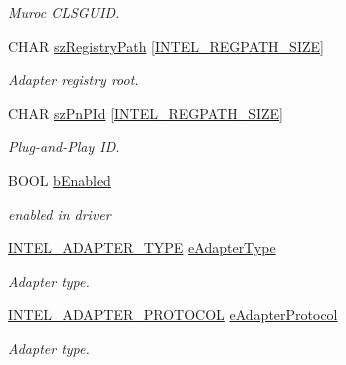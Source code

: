 \begin{DoxyCompactItemize}
\begin{DoxyCompactList}\small\item\em Muroc C\+L\+S\+G\+U\+ID. \end{DoxyCompactList}\item 
C\+H\+AR \hyperlink{struct_i_n_t_e_l___a_d_a_p_t_e_r___l_i_s_t___e_n_t_r_y_ad178b9652af00eb62eb340935223402c}{sz\+Registry\+Path} \mbox{[}\hyperlink{intel__wireless_8hpp_a72b0ab4e2fb5f31d00948cfe36b8440e}{I\+N\+T\+E\+L\+\_\+\+R\+E\+G\+P\+A\+T\+H\+\_\+\+S\+I\+ZE}\mbox{]}
\begin{DoxyCompactList}\small\item\em Adapter registry root. \end{DoxyCompactList}\item 
C\+H\+AR \hyperlink{struct_i_n_t_e_l___a_d_a_p_t_e_r___l_i_s_t___e_n_t_r_y_a135fb44299c2c5a066e24535839ce70c}{sz\+Pn\+P\+Id} \mbox{[}\hyperlink{intel__wireless_8hpp_a72b0ab4e2fb5f31d00948cfe36b8440e}{I\+N\+T\+E\+L\+\_\+\+R\+E\+G\+P\+A\+T\+H\+\_\+\+S\+I\+ZE}\mbox{]}
\begin{DoxyCompactList}\small\item\em Plug-\/and-\/\+Play ID. \end{DoxyCompactList}\item 
B\+O\+OL \hyperlink{struct_i_n_t_e_l___a_d_a_p_t_e_r___l_i_s_t___e_n_t_r_y_a5c36e949e9ef3119ff45bb3f6a981f0c}{b\+Enabled}
\begin{DoxyCompactList}\small\item\em enabled in driver \end{DoxyCompactList}\item 
\hyperlink{intel__wireless_8hpp_af41772119be4b7904fd0a8851aec9f1c}{I\+N\+T\+E\+L\+\_\+\+A\+D\+A\+P\+T\+E\+R\+\_\+\+T\+Y\+PE} \hyperlink{struct_i_n_t_e_l___a_d_a_p_t_e_r___l_i_s_t___e_n_t_r_y_ab4c28b72a811814f8ecb48ebd4f46262}{e\+Adapter\+Type}
\begin{DoxyCompactList}\small\item\em Adapter type. \end{DoxyCompactList}\item 
\hyperlink{intel__wireless_8hpp_a41fbd9995164b3d480e94b6feb40ba73}{I\+N\+T\+E\+L\+\_\+\+A\+D\+A\+P\+T\+E\+R\+\_\+\+P\+R\+O\+T\+O\+C\+OL} \hyperlink{struct_i_n_t_e_l___a_d_a_p_t_e_r___l_i_s_t___e_n_t_r_y_ad4fca45e9885dd5d87db9a2611e3afd0}{e\+Adapter\+Protocol}
\begin{DoxyCompactList}\small\item\em Adapter type. \end{DoxyCompactList}\end{DoxyCompactItemize}


